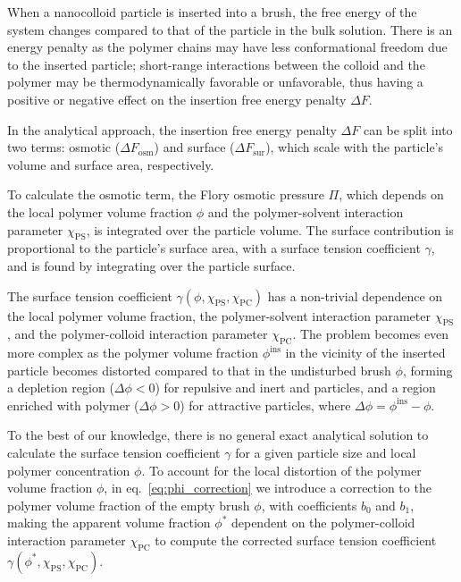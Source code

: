 \documentclass[10pt, a4paper]{article}
\begin{document}
\begin{multicols}{2}
When a nanocolloid particle is inserted into a brush, the free energy of the system changes compared to that of the particle in the bulk solution.
There is an energy penalty as the polymer chains may have less conformational freedom due to the inserted particle; short-range interactions between the colloid and the polymer may be thermodynamically favorable or unfavorable, thus having a positive or negative effect on the insertion free energy penalty $\Delta F$.

In the analytical approach, the insertion free energy penalty $\Delta F$ can be split into two terms: osmotic ($\Delta F_{\text{osm}}$) and surface ($\Delta F_{\text{sur}}$), which scale with the particle's volume and surface area, respectively.

To calculate the osmotic term, the Flory osmotic pressure $\Pi$, which depends on the local polymer volume fraction $\phi$ and the polymer-solvent interaction parameter $\chi_{\text{PS}}$, is integrated over the particle volume.
The surface contribution is proportional to the particle's surface area, with a surface tension coefficient $\gamma$, and is found by integrating over the particle surface.

The surface tension coefficient $\gamma(\phi, \chi_{\text{PS}}, \chi_{\text{PC}})$ has a non-trivial dependence on the local polymer volume fraction, the polymer-solvent interaction parameter $\chi_{\text{PS}}$, and the polymer-colloid interaction parameter $\chi_{\text{PC}}$.
The problem becomes even more complex as the polymer volume fraction $\phi^{\text{ins}}$ in the vicinity of the inserted particle becomes distorted compared to that in the undisturbed brush $\phi$, forming a depletion region ($\Delta \phi < 0$) for repulsive and inert and particles, and a region enriched with polymer ($\Delta \phi > 0$) for attractive particles, where $\Delta \phi = \phi^{\text{ins}} - \phi$.


To the best of our knowledge, there is no general exact analytical solution to calculate the surface tension coefficient $\gamma$ for a given particle size and local polymer concentration $\phi$.
To account for the local distortion of the polymer volume fraction $\phi$, in eq.~\ref{eq:phi_correction} we introduce a correction to the polymer volume fraction of the empty brush $\phi$, with coefficients $b_0$ and $b_1$, making the apparent volume fraction $\phi^{\ast}$ dependent on the polymer-colloid interaction parameter $\chi_{\text{PC}}$ to compute the corrected surface tension coefficient $\gamma(\phi^{\ast}, \chi_{\text{PS}}, \chi_{\text{PC}})$.


\end{multicols}
\end{document}
